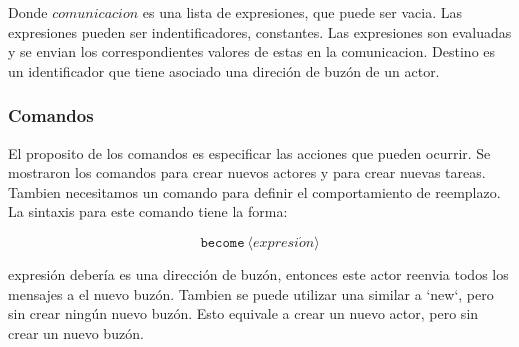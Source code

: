 Donde $comunicacion$ es una lista de expresiones, que puede ser vacia. Las expresiones pueden ser indentificadores, constantes. Las expresiones son evaluadas y se envian los correspondientes valores de estas en la comunicacion. Destino es un identificador que tiene asociado una direción de buzón de un actor.

\subsubsection*{Comandos}

El proposito de los comandos es especificar las acciones que pueden ocurrir. Se mostraron los comandos para crear nuevos actores y para crear nuevas tareas. Tambien necesitamos un comando para definir el comportamiento de reemplazo. La sintaxis para este comando tiene la forma:

\[
 \texttt{become}\ \langle expresi\acute{o}n \rangle
\]

expresión debería es una dirección de buzón, entonces este actor reenvia todos los mensajes a el nuevo buzón. Tambien se puede utilizar una similar a `new`, pero sin crear ningún nuevo buzón. Esto equivale a crear un nuevo actor, pero sin crear un nuevo buzón.
